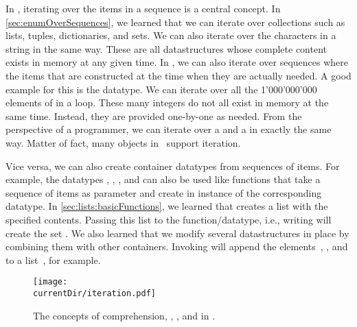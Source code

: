 %
\label{sec:iteration}%
%
In \python, iterating over the items in a sequence is a central concept.
In \cref{sec:enumOverSequences}, we learned that we can iterate over collections such as lists, tuples, dictionaries, and sets.
We can also iterate over the characters in a string in the same way.
These are all datastructures whose complete content exists in memory at any given time.
In \python, we can also iterate over sequences where the items that are constructed at the time when they are actually needed.
A good example for this is the  datatype.
We can iterate over all the 1'000'000'000  elements of  in a loop.
These many integers do not all exist in memory at the same time.
Instead, they are provided one-by-one as needed.
From the perspective of a programmer, we can iterate over a  and a  in exactly the same way.
Matter of fact, many objects in \python\ support iteration.

Vice versa, we can also create container datatypes from sequences of items.
For example, the datatypes , , , and  can also be used like functions that take a sequence of items as parameter and create in instance of the corresponding datatype.
In \cref{sec:lists:basicFunctions}, we learned that \pythonil{[1, 2, 2, 3]} creates a list with the specified contents.
Passing this list to the  function/datatype, i.e., writing  will create the set .
We also learned that we modify several datastructures in place by combining them with other containers.
Invoking  will append the elements~, , and  to a list~, for example.

\begin{figure}%
\centering%
\texttt{[image: \\currentDir/iteration.pdf]}%
\caption{The concepts of comprehension, , , and  in \python.}%
\label{fig:iteration}%
\end{figure}%

